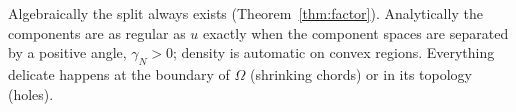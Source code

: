 \begin{keypoint}
Algebraically the split always exists (Theorem~\ref{thm:factor}). Analytically the components are as regular as $u$ exactly when the component spaces are separated by a positive angle, $\gamma_N>0$; density is automatic on convex regions. Everything delicate happens at the boundary of $\Omega$ (shrinking chords) or in its topology (holes).
\end{keypoint}
